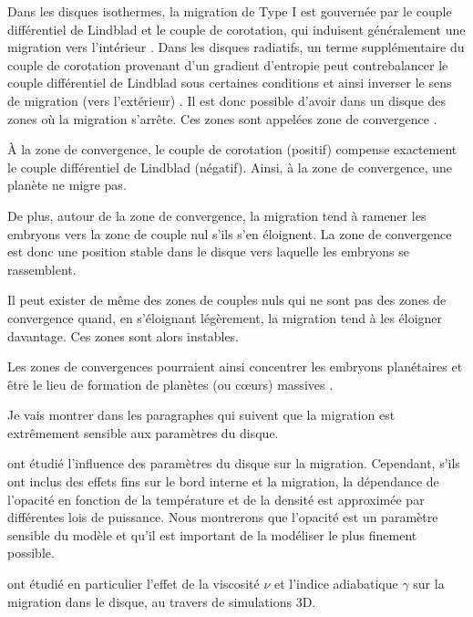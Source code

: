 Dans les disques isothermes, la migration de Type I est gouvernée par le couple différentiel de Lindblad et le couple de corotation, qui induisent généralement
une migration vers l'intérieur \citep{goldreich1980disk, ward1986density, tanaka2002three}. Dans les disques radiatifs, un terme supplémentaire du couple de corotation provenant d'un gradient d'entropie peut contrebalancer le couple
différentiel de Lindblad sous certaines conditions et ainsi inverser le sens de migration (vers l'extérieur)
\citep{paardekooper2006halting, kley2008migration}. Il est donc possible d'avoir dans un disque des zones où la migration
s'arrête. Ces zones sont appelées zone de convergence \citep[CZs;][]{lyra2010orbital,
paardekooper2011torque, hellary2012global}. 

\bigskip

À la zone de convergence, le couple de corotation (positif) compense exactement le couple différentiel de Lindblad (négatif).
Ainsi, à la zone de convergence, une planète ne migre pas.

De plus, autour de la zone de convergence, la migration tend à ramener les embryons vers la zone de couple nul s'ils s'en
éloignent. La zone de convergence est donc une position stable dans le disque vers laquelle les embryons se rassemblent.

Il peut exister de même des zones de couples nuls qui ne sont pas des zones de convergence quand, en s'éloignant légèrement, la
migration tend à les éloigner davantage. Ces zones sont alors instables.

Les zones de convergences pourraient ainsi concentrer les embryons planétaires et être le lieu de formation de planètes (ou
cœurs) massives \citep{lyra2010orbital, horn2012orbital}. 

\bigskip

Je vais montrer dans les paragraphes qui suivent que la migration est extrêmement sensible aux paramètres du disque.

\cite{kretke2012importance} ont étudié l'influence des paramètres du disque sur la migration. Cependant, s'ils ont inclus des
effets fins sur le bord interne et la migration, la dépendance de l'opacité en fonction de la température et de la densité est
approximée par différentes lois de puissance. Nous montrerons que l'opacité est un paramètre sensible du modèle et qu'il est
important de la modéliser le plus finement possible. 

\cite{bitsch2013influence} ont étudié en particulier l'effet de la viscosité $\nu$ et l'indice adiabatique $\gamma$ sur la
migration dans le disque, au travers de simulations 3D. 

